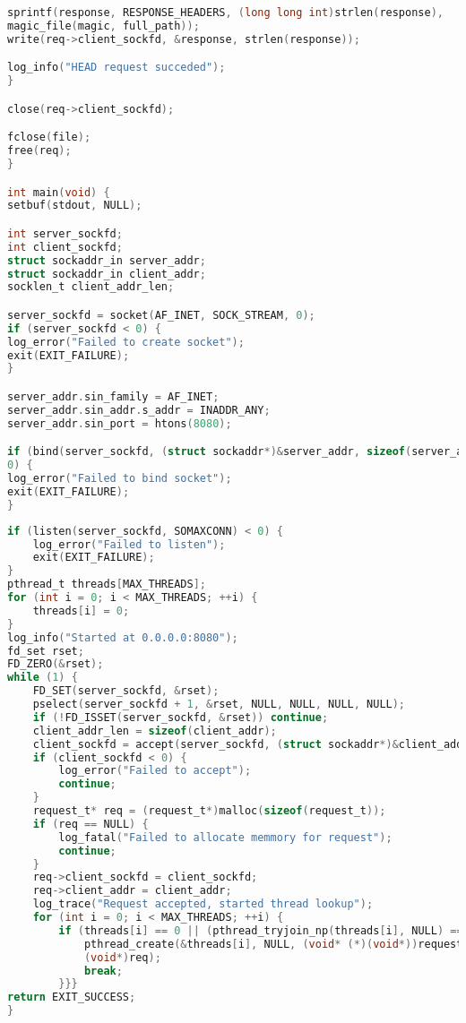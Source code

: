 \begin{lstlisting}[label=lst:s5,caption=Исходный код сервера, language=c]
sprintf(response, RESPONSE_HEADERS, (long long int)strlen(response),
magic_file(magic, full_path));
write(req->client_sockfd, &response, strlen(response));

log_info("HEAD request succeded");
}

close(req->client_sockfd);

fclose(file);
free(req);
}

int main(void) {
setbuf(stdout, NULL);

int server_sockfd;
int client_sockfd;
struct sockaddr_in server_addr;
struct sockaddr_in client_addr;
socklen_t client_addr_len;

server_sockfd = socket(AF_INET, SOCK_STREAM, 0);
if (server_sockfd < 0) {
log_error("Failed to create socket");
exit(EXIT_FAILURE);
}

server_addr.sin_family = AF_INET;
server_addr.sin_addr.s_addr = INADDR_ANY;
server_addr.sin_port = htons(8080);

if (bind(server_sockfd, (struct sockaddr*)&server_addr, sizeof(server_addr)) <
0) {
log_error("Failed to bind socket");
exit(EXIT_FAILURE);
}
\end{lstlisting}

\begin{lstlisting}[label=lst:s6,caption=Исходный код сервера, language=c]
if (listen(server_sockfd, SOMAXCONN) < 0) {
	log_error("Failed to listen");
	exit(EXIT_FAILURE);
}
pthread_t threads[MAX_THREADS];
for (int i = 0; i < MAX_THREADS; ++i) {
	threads[i] = 0;
}
log_info("Started at 0.0.0.0:8080");
fd_set rset;
FD_ZERO(&rset);
while (1) {
	FD_SET(server_sockfd, &rset);
	pselect(server_sockfd + 1, &rset, NULL, NULL, NULL, NULL);
	if (!FD_ISSET(server_sockfd, &rset)) continue;
	client_addr_len = sizeof(client_addr);
	client_sockfd =	accept(server_sockfd, (struct sockaddr*)&client_addr, &client_addr_len);
	if (client_sockfd < 0) {
		log_error("Failed to accept");
		continue;
	}
	request_t* req = (request_t*)malloc(sizeof(request_t));
	if (req == NULL) {
		log_fatal("Failed to allocate memmory for request");
		continue;
	}
	req->client_sockfd = client_sockfd;
	req->client_addr = client_addr;
	log_trace("Request accepted, started thread lookup");	
	for (int i = 0; i < MAX_THREADS; ++i) {
		if (threads[i] == 0 || (pthread_tryjoin_np(threads[i], NULL) == 0)) {
			pthread_create(&threads[i], NULL, (void* (*)(void*))request_handler,
			(void*)req);
			break;
		}}}
return EXIT_SUCCESS;
}
\end{lstlisting}

